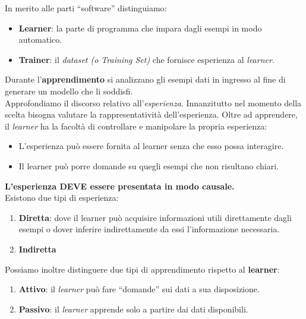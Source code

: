 In merito alle parti ``software'' distinguiamo:
\begin{itemize}
  \item \textbf{Learner}: la parte di programma che impara dagli esempi in modo
  automatico.
  \item \textbf{Trainer}: il \textit{dataset (o Training Set)} che fornisce esperienza al
  \textit{learner}.
\end{itemize}
Durante l'\textbf{apprendimento} si analizzano gli esempi dati in ingresso al fine di generare un modello che li soddisfi.\\
Approfondiamo il discorso relativo all'\textit{esperienza}. Innanzitutto nel
momento della scelta bisogna valutare la rappresentatività dell'esperienza. 
Oltre ad apprendere, il \textit{learner} ha la facoltà di controllare e manipolare la propria esperienza:
\begin{itemize}
  \item L'esperienza può essere fornita al learner senza che esso possa
  interagire.
  \item Il learner può porre domande su quegli esempi che non risultano chiari. 
\end{itemize}
\textbf{L'esperienza DEVE essere presentata in modo causale.}\\
Esistono due tipi di esperienza:
\begin{enumerate}
  \item \textbf{Diretta}: dove il learner può acquisire informazioni utili
  direttamente dagli esempi o dover inferire indirettamente da essi
  l’informazione necessaria.
  \item \textbf{Indiretta}
\end{enumerate}
Possiamo inoltre distinguere due tipi di apprendimento rispetto al \textbf{learner}:
\begin{enumerate}
  \item \textbf{Attivo}: il \textit{learner} può fare ``domande'' sui dati
  a sua disposizione. 
  \item \textbf{Passivo}: il \textit{learner} apprende solo a partire dai
  dati disponibili. 
\end{enumerate}
\newpage

